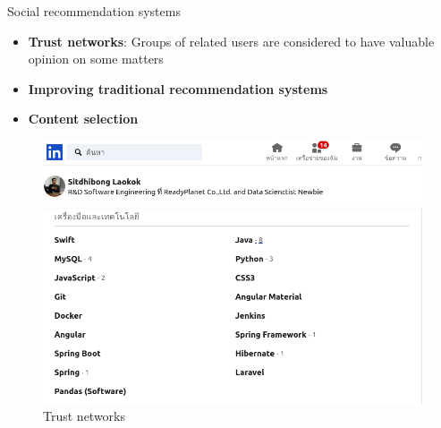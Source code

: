 \documentclass[8pt]{beamer}
\begin{document}
  \begin{frame}{Social recommendation systems}
  	\vfill
    \begin{itemize}
      \item \textbf{Trust networks}: Groups of related users are considered to have valuable opinion on some matters
      \item \textbf{Improving traditional recommendation systems}
      \item \textbf{Content selection}
    \end{itemize}
    
	\vfill
    \begin{figure}
    	\includegraphics[scale=0.2]{asset/trusted-network.png}
    	\caption{Trust networks}
    \end{figure}
    
  \end{frame}
  
\end{document}
